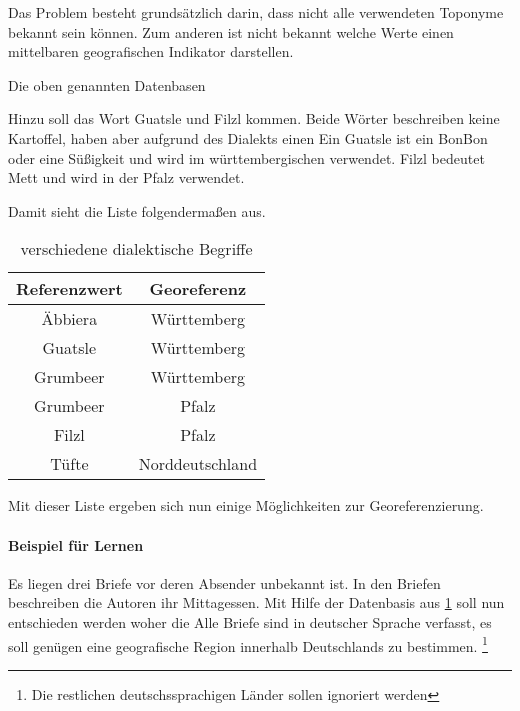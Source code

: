 			Das Problem besteht grundsätzlich darin, dass nicht alle verwendeten Toponyme bekannt sein können. 
			Zum anderen ist nicht bekannt welche Werte einen mittelbaren geografischen Indikator darstellen.




			Die oben genannten Datenbasen  

				Hinzu soll das Wort Guatsle und Filzl kommen.
				Beide Wörter beschreiben keine Kartoffel, haben aber aufgrund des Dialekts einen 
				Ein Guatsle ist ein BonBon oder eine Süßigkeit und wird im württembergischen verwendet.
				Filzl bedeutet Mett und wird in der Pfalz verwendet.

				Damit sieht die Liste folgendermaßen aus.

				\begin{table}[htpb]
					\caption{verschiedene dialektische Begriffe} 
					\centering
					\begin{tabular}{|c|c|}
						\hline
						Referenzwert & Georeferenz \\
						\hline\hline
						Äbbiera & Württemberg \\
						\hline
						Guatsle & Württemberg \\
						\hline
						Grumbeer & Württemberg \\
						\hline
						Grumbeer & Pfalz \\
						\hline
						Filzl & Pfalz \\
						\hline
						Tüfte & Norddeutschland \\
						\hline
					\end{tabular}
					\label{tab:dialektZwei} 
				\end{table} 

				Mit dieser Liste ergeben sich nun einige Möglichkeiten zur Georeferenzierung.

			

			\paragraph{Beispiel für Lernen} 

				Es liegen drei Briefe vor deren Absender unbekannt ist.
				In den Briefen beschreiben die Autoren ihr Mittagessen. 
				Mit Hilfe der Datenbasis aus \ref{tab:dialektZwei} soll nun entschieden werden woher die 
				Alle Briefe sind in deutscher Sprache verfasst, es soll genügen eine geografische Region innerhalb Deutschlands zu bestimmen. \footnote{Die restlichen deutschssprachigen Länder sollen ignoriert werden}  


